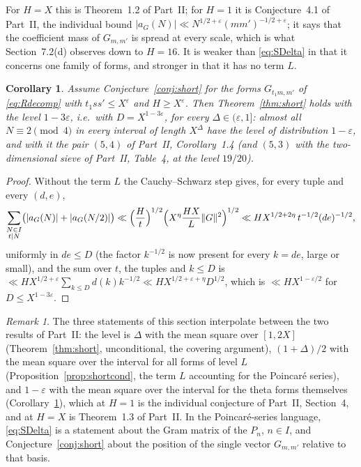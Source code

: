\documentclass[11pt,a4paper]{article}
\newtheorem{corollary}[theorem]{Corollary}
\theoremstyle{remark}
\newtheorem{remark}[theorem]{Remark}
\theoremstyle{definition}
\newcommand{\e}{\varepsilon}
\begin{document}
For $H=X$ this is Theorem~1.2 of Part~II; for $H=1$ it is Conjecture~4.1 of Part~II, the individual bound $|a_G(N)|\ll N^{1/2+\e}(mm')^{-1/2+\e}$; it says that the coefficient mass of $G_{m,m'}$ is spread at every scale, which is what Section~7.2(d) observes down to $H=16$. It is weaker than \eqref{eq:SDelta} in that it concerns one family of forms, and stronger in that it has no term $L$.

\begin{corollary}\label{cor:short}
Assume Conjecture~\ref{conj:short} for the forms $G_{t_1m,m'}$ of \eqref{eq:Rdecomp} with $t_1ss'\le X^\e$ and $H\ge X^{\e}$. Then Theorem~\ref{thm:short} holds with the level $1-3\e$, i.e.\ with $D=X^{1-3\e}$, for every $\Delta\in(\e,1]$: almost all $N\equiv2\pmod 4$ in every interval of length $X^\Delta$ have the level of distribution $1-\e$, and with it the pair $(5,4)$ of Part~II, Corollary~1.4 (and $(5,3)$ with the two-dimensional sieve of Part~II, Table~4, at the level $19/20$).
\end{corollary}
\begin{proof}
Without the term $L$ the Cauchy--Schwarz step gives, for every tuple and every $(d,e)$,
\[
\sum_{\substack{N\in I\\ t\mid N}}\bigl(|a_G(N)|+|a_G(N/2)|\bigr)\ll\Bigl(\frac Ht\Bigr)^{1/2}\Bigl(X^{\eta}\frac{HX}{L}\|G\|^2\Bigr)^{1/2}\ll HX^{1/2+2\eta}\,t^{-1/2}(de)^{-1/2},
\]
uniformly in $de\le D$ (the factor $k^{-1/2}$ is now present for every $k=de$, large or small), and the sum over $t$, the tuples and $k\le D$ is $\ll HX^{1/2+\e}\sum_{k\le D}d(k)k^{-1/2}\ll HX^{1/2+\e+\eta}D^{1/2}$, which is $\ll HX^{1-\e/2}$ for $D\le X^{1-3\e}$.
\end{proof}

\begin{remark}
The three statements of this section interpolate between the two results of Part~II: the level is $\Delta$ with the mean square over $[1,2X]$ (Theorem~\ref{thm:short}, unconditional, the covering argument), $(1+\Delta)/2$ with the mean square over the interval for all forms of level $L$ (Proposition~\ref{prop:shortcond}, the term $L$ accounting for the Poincar\'e series), and $1-\e$ with the mean square over the interval for the theta forms themselves (Corollary~\ref{cor:short}), which at $H=1$ is the individual conjecture of Part~II, Section~4, and at $H=X$ is Theorem~1.3 of Part~II. In the Poincar\'e-series language, \eqref{eq:SDelta} is a statement about the Gram matrix of the $P_n$, $n\in I$, and Conjecture~\ref{conj:short} about the position of the single vector $G_{m,m'}$ relative to that basis.
\end{remark}
\end{document}
